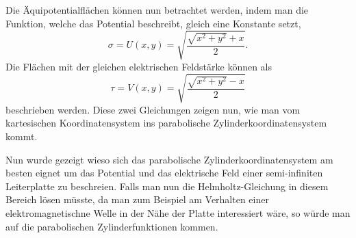 Die Äquipotentialflächen können nun betrachtet werden, 
indem man die Funktion, welche das Potential beschreibt, gleich eine Konstante setzt,
\begin{equation}
	\sigma = U(x,y) = \sqrt{\frac{\sqrt{x^2+y^2} + x}{2}}.
\end{equation}
Die Flächen mit der gleichen elektrischen Feldstärke können als
\begin{equation}
	\tau = V(x,y) = \sqrt{\frac{\sqrt{x^2+y^2} - x}{2}}
\end{equation}
beschrieben werden. Diese zwei Gleichungen zeigen nun, wie man vom 
kartesischen Koordinatensystem ins parabolische Zylinderkoordinatensystem kommt.


Nun wurde gezeigt wieso sich das parabolische Zylinderkoordinatensystem am besten eignet um das Potential und das elektrische Feld einer semi-infiniten Leiterplatte zu beschreien. Falls man nun die Helmholtz-Gleichung in diesem Bereich lösen müsste, da man zum Beispiel am Verhalten einer elektromagnetischne Welle in der Nähe der Platte interessiert wäre, so würde man auf die parabolischen Zylinderfunktionen kommen. 
